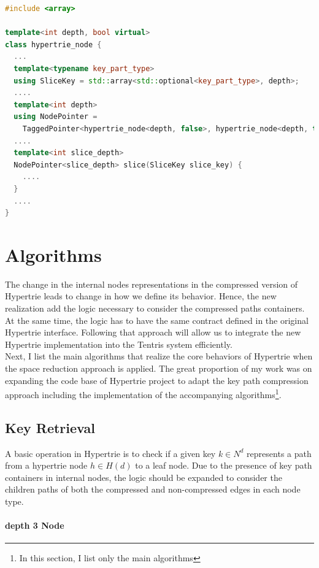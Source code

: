 \begin{lstlisting}[caption={Slicing method signituar defined for node where d = $depth$ in the space-friendly Hypertrie},label={lst:slicing_original_hypertrie},language=C++]
#include <array>

template<int depth, bool virtual>
class hypertrie_node {
  ...
  template<typename key_part_type>
  using SliceKey = std::array<std::optional<key_part_type>, depth>;
  ....
  template<int depth>
  using NodePointer = 
    TaggedPointer<hypertrie_node<depth, false>, hypertrie_node<depth, true>>;
  ....
  template<int slice_depth>
  NodePointer<slice_depth> slice(SliceKey slice_key) {
 	....
  }
  ....
}
\end{lstlisting} 



\section{Algorithms}
The change in the internal nodes representations in the compressed version of Hypertrie leads to change in how we define its behavior. 
Hence, the new realization add the logic necessary to consider the compressed paths containers. 
At the same time, the logic has to have the same contract defined in the original Hypertrie interface. 
Following that approach will allow us to integrate the new Hypertrie implementation into the Tentris system efficiently. \\

Next, I list the main algorithms that realize the core behaviors of Hypertrie when the space reduction approach is applied. The great proportion of my work was on expanding the code base of Hypertrie project to adapt the key path compression approach including the implementation of the accompanying algorithms\footnote{In this section, I list only the main algorithms}.

\subsection{Key Retrieval}
A basic operation in Hypertrie is to check if a given key $k \in N^d$ represents a path from a hypertrie node $h \in H(d)$ to a leaf node. Due to the presence of key path containers in internal nodes, the logic should be expanded to consider the children paths of both the compressed and non-compressed edges in each node type. \\

\paragraph{depth 3 Node}

